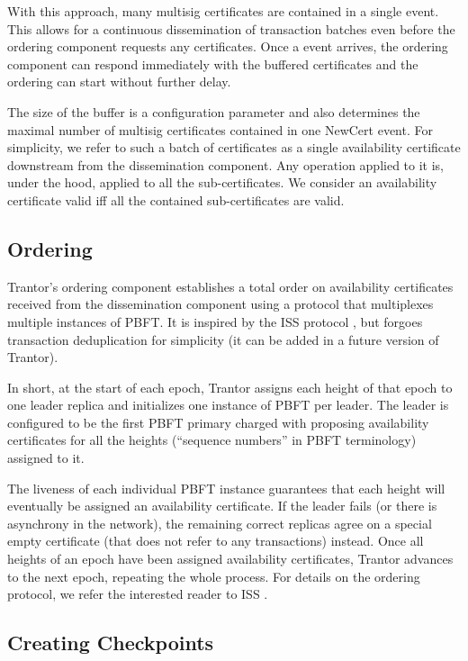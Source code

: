 \documentclass{article}
\begin{document}
With this approach, many multisig certificates are contained in a single  event.
This allows for a continuous dissemination of transaction batches
even before the ordering component requests any certificates.
Once a  event arrives, the ordering component can respond immediately with the buffered certificates
and the ordering can start without further delay.

The size of the buffer is a configuration parameter
and also determines the maximal number of multisig certificates contained in one NewCert event.
For simplicity, we refer to such a batch of certificates as a single availability certificate
downstream from the dissemination component.
Any operation applied to it is, under the hood, applied to all the sub-certificates.
We consider an availability certificate valid iff all the contained sub-certificates are valid.

\subsection{Ordering}

Trantor’s ordering component establishes a total order on availability certificates
received from the dissemination component using a protocol that multiplexes multiple instances of PBFT.
It is inspired by the ISS protocol \cite{iss}, but forgoes transaction deduplication for simplicity
(it can be added in a future version of Trantor).

In short, at the start of each epoch, Trantor assigns each height of that epoch to one leader replica
and initializes one instance of PBFT per leader.
The leader is configured to be the first PBFT primary charged with proposing availability certificates
for all the heights (“sequence numbers” in PBFT terminology) assigned to it.

The liveness of each individual PBFT instance guarantees
that each height will eventually be assigned an availability certificate.
If the leader fails (or there is asynchrony in the network),
the remaining correct replicas agree on a special empty certificate (that does not refer to any transactions) instead. Once all heights of an epoch have been assigned availability certificates,
Trantor advances to the next epoch, repeating the whole process.
For details on the ordering protocol, we refer the interested reader to ISS \cite{iss}.

\subsection{Creating Checkpoints}
\label{sec:creating-checkpoints}
\end{document}
